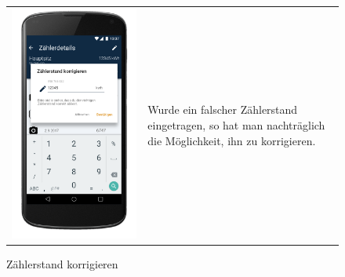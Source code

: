 \begin{figure}[h]
\begin{tabularx}{\textwidth}{X  X}
	\includegraphics[scale = 0.155]{img/AndroidMockup/correct} \caption{Zählerstand korrigieren} & Wurde ein falscher Zählerstand eingetragen, so hat man nachträglich die Möglichkeit, ihn zu korrigieren.\\ 
\end{tabularx}
\end{figure}

